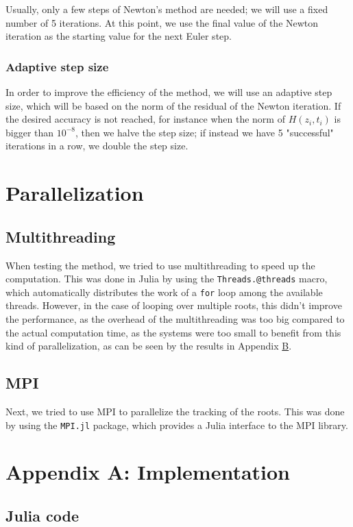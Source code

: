 \documentclass[a4paper]{article}
\theoremstyle{definition}
\theoremstyle{definition}
\theoremstyle{remark}
\theoremstyle{definition}
\begin{document}
Usually, only a few steps of Newton's method are needed; we will use a fixed number of 5 iterations.
At this point, we use the final value of the Newton iteration as the starting value for the next Euler step.
\subsubsection{Adaptive step size}
In order to improve the efficiency of the method, we will use an adaptive step size, which will be based on the norm of the residual of the Newton iteration.
If the desired accuracy is not reached, for instance when the norm of $H(z_i,t_i)$ is bigger than $10^{-8}$,
then we halve the step size; if instead we have 5 "successful" iterations in a row, we double the step size.

\section{Parallelization}
\subsection{Multithreading}
When testing the method, we tried to use multithreading to speed up the computation.
This was done in Julia by using the \texttt{Threads.@threads} macro, which automatically distributes the work of a \texttt{for} loop among the available threads.
However, in the case of looping over multiple roots, this didn't improve the performance, as the overhead of the multithreading was too big compared to the actual computation time,
as the systems were too small to benefit from this kind of parallelization, as can be seen by the results in Appendix \hyperref[sec:mt]{B}.

\subsection{MPI}
Next, we tried to use MPI to parallelize the tracking of the roots.
This was done by using the \texttt{MPI.jl} package, which provides a Julia interface to the MPI library.

\section{Appendix A: Implementation}
\subsection{Julia code}
\end{document}
